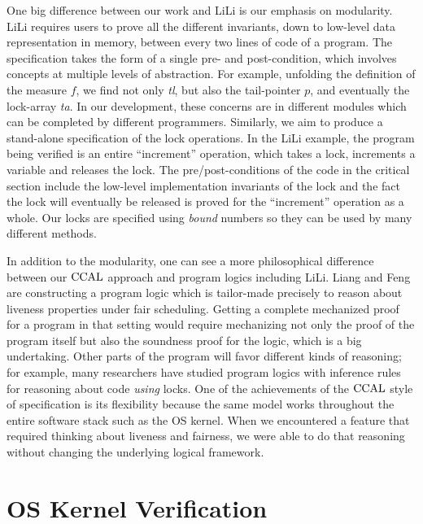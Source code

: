 One big difference between our work and LiLi is our emphasis on
modularity.  
LiLi requires users to prove all the different invariants, down to low-level data representation in memory, between every two lines of code of a program.
The specification takes the form of a single
pre- and post-condition, which involves concepts at multiple levels of
abstraction. For example, unfolding the definition of the measure $f$,
we find not only \textit{tl}, but also the tail-pointer $p$, and
eventually the lock-array  \textit{ta}. In our development, these
concerns are in different modules which can be completed by different
programmers.  Similarly, we aim to produce a stand-alone specification
of the lock operations. In the LiLi example, the program being
verified is an entire ``increment'' operation, which takes a lock,
increments a variable and releases the lock. The pre/post-conditions
of the code in the critical section include the low-level
implementation invariants of the lock and the fact the lock will
eventually be released is proved for the ``increment'' operation as a
whole. Our locks are specified using \emph{bound} numbers so they can be used by many different methods.

In addition to the modularity, one can see a more philosophical difference
between our $\mathrm{CCAL}$ approach and program logics including LiLi.  
Liang and Feng are constructing a program logic which is tailor-made
precisely to reason about liveness properties under fair
scheduling. 
Getting a complete mechanized proof for a program in that
setting would require mechanizing not only the proof of the program
itself but also the soundness proof for the logic, which is a big
undertaking. 
Other parts of the program will favor different kinds of
reasoning; for example, many researchers have studied program logics
with inference rules for reasoning about code \emph{using} locks. One
of the achievements of the $\mathrm{CCAL}$ style of specification is its flexibility because the same model works throughout the entire software stack such as the OS kernel. When
we encountered a feature that required thinking about liveness and
fairness, we were able to do that reasoning without changing the
underlying logical framework.


\section{OS Kernel Verification} 
\label{chatper:related:sec:os-kernel-verification}

